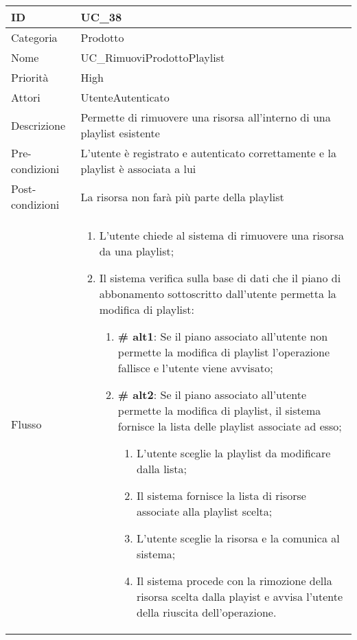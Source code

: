 \begin{center}
\begin{tabular}{ |p{2cm}|p{13cm}|  }
\hline
ID & UC\_38\\\hline
Categoria & Prodotto \\\hline
Nome & UC\_RimuoviProdottoPlaylist\\\hline
Priorità & High \\\hline
Attori &  UtenteAutenticato \\\hline
Descrizione & Permette di rimuovere una risorsa all'interno di una playlist esistente\\\hline
Pre-condizioni & L'utente è registrato e autenticato correttamente e la playlist è associata a lui\\\hline
Post-condizioni & La risorsa non farà più parte della playlist\\\hline
Flusso &  	\begin{enumerate}
		\item L'utente chiede al sistema di rimuovere una risorsa da una playlist;
		\item Il sistema verifica sulla base di dati che il piano di abbonamento sottoscritto dall'utente permetta la modifica di playlist:
		 \begin{enumerate}[label*=\arabic*.]
			\item \textbf{\# alt1}: Se il piano associato all'utente non permette la modifica di playlist l'operazione fallisce e l'utente viene avvisato;
			\item \textbf{\# alt2}: Se il piano associato all'utente permette la modifica di playlist, il sistema  fornisce la lista delle playlist associate ad esso;
			\begin{enumerate}[label*=\arabic*.]
				\item L'utente sceglie la playlist da modificare dalla lista;
				\item Il sistema fornisce la lista di risorse associate alla playlist scelta;
				\item L'utente sceglie la risorsa e la comunica al sistema;
				\item Il sistema procede con la rimozione della risorsa scelta dalla playist e avvisa l'utente della riuscita dell'operazione.
			\end{enumerate}
		\end{enumerate}
		\end{enumerate}\\\hline
\end{tabular}
\label{table_use_case:38}\newline


\end{center}

